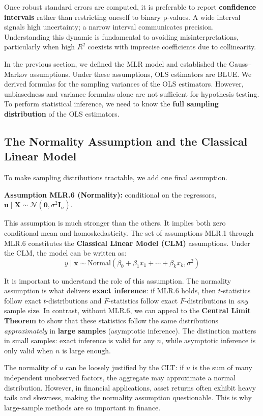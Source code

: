 Once robust standard errors are computed, it is preferable to report \textbf{confidence intervals} rather than restricting oneself to binary p-values. A wide interval signals high uncertainty; a narrow interval communicates precision. Understanding this dynamic is fundamental to avoiding misinterpretations, particularly when high $R^2$ coexists with imprecise coefficients due to collinearity.


In the previous section, we defined the MLR model and established the Gauss--Markov assumptions. Under these assumptions, OLS estimators are BLUE. We derived formulas for the sampling variances of the OLS estimators. However, unbiasedness and variance formulas alone are not sufficient for hypothesis testing. To perform statistical inference, we need to know the \textbf{full sampling distribution} of the OLS estimators.
\subsection{The Normality Assumption and the Classical Linear Model}

To make sampling distributions tractable, we add one final assumption.

\textbf{Assumption MLR.6 (Normality):} conditional on the regressors, $\mathbf u\mid\mathbf X\sim\mathcal N(\mathbf 0,\sigma^2\mathbf I_n)$.

This assumption is much stronger than the others. It implies both zero conditional mean and homoskedasticity. The set of assumptions MLR.1 through MLR.6 constitutes the \textbf{Classical Linear Model (CLM)} assumptions. Under the CLM, the model can be written as:
$$y \mid \mathbf{x} \sim \text{Normal}(\beta_0 + \beta_1 x_1 + \cdots + \beta_k x_k, \sigma^2)$$

It is important to understand the role of this assumption. The normality assumption is what delivers \textbf{exact inference}: if MLR.6 holds, then $t$-statistics follow exact $t$-distributions and $F$-statistics follow exact $F$-distributions in \emph{any} sample size. In contrast, without MLR.6, we can appeal to the \textbf{Central Limit Theorem} to show that these statistics follow the same distributions \emph{approximately} in \textbf{large samples} (asymptotic inference). The distinction matters in small samples: exact inference is valid for any $n$, while asymptotic inference is only valid when $n$ is large enough.

The normality of $u$ can be loosely justified by the CLT: if $u$ is the sum of many independent unobserved factors, the aggregate may approximate a normal distribution. However, in financial applications, asset returns often exhibit heavy tails and skewness, making the normality assumption questionable. This is why large-sample methods are so important in finance.


